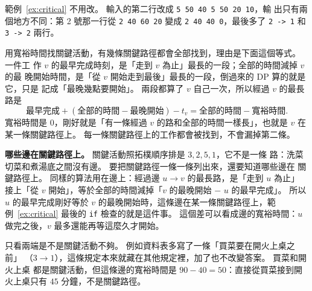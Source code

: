 \begin{center}
\label{fig:hotpot-two}
\end{center}

範例~\ref{ex:critical} 不用改。 輸入的第二行改成 \texttt{5 50 40 5 50 20 10}，輸
出只有兩個地方不同：第 2 號那一行從 \texttt{2 40 60 20} 變成
\texttt{2 40 40 0}，最後多了 \texttt{2 -> 1} 和 \texttt{3 -> 2} 兩行。

用寬裕時間找關鍵活動，有幾條關鍵路徑都會全部找到，理由是下面這個等式。 一件工
作 $v$ 的最早完成時刻，是「走到 $v$ 為止」最長的一段；全部的時間減掉 $v$ 的最
晚開始時間，是「從 $v$ 開始走到最後」最長的一段，倒過來的 DP 算的就是它，只是
記成「最晚幾點要開始」。 兩段都算了 $v$ 自己一次，所以經過 $v$ 的最長路是
\[
\text{最早完成} + (\text{全部的時間} - \text{最晚開始}) - t_v
= \text{全部的時間} - \text{寬裕時間}.
\]
寬裕時間是 $0$，剛好就是「有一條經過 $v$ 的路和全部的時間一樣長」，也就是 $v$
在某一條關鍵路徑上。 每一條關鍵路徑上的工作都會被找到，不會漏掉第二條。

\textbf{哪些邊在關鍵路徑上。} 關鍵活動照拓樸順序排是 $3, 2, 5, 1$，它不是一條
路：洗菜切菜和煮湯底之間沒有邊。 要把關鍵路徑一條一條列出來，還要知道哪些邊在
關鍵路徑上。 同樣的算法用在邊上：經過邊 $u \to v$ 的最長路，是「走到 $u$ 為止」
接上「從 $v$ 開始」，等於全部的時間減掉「$v$ 的最晚開始 $-$ $u$ 的最早完成」。
所以 $u$ 的最早完成剛好等於 $v$ 的最晚開始時，這條邊在某一條關鍵路徑上，範例~\ref{ex:critical} 最後的 \texttt{if} 檢查的就是這件事。 這個差可以看成邊的寬裕時間：$u$ 做完之後，$v$ 最多還能再等這麼久才開始。

只看兩端是不是關鍵活動不夠。 例如資料表多寫了一條「買菜要在開火上桌之前」
（$3 \to 1$），這條規定本來就藏在其他規定裡，加了也不改變答案。 買菜和開火上桌
都是關鍵活動，但這條邊的寬裕時間是 $90 - 40 = 50$：直接從買菜接到開火上桌只有
$45$ 分鐘，不是關鍵路徑。

